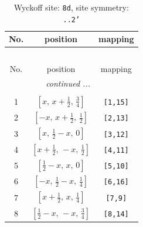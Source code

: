 \documentclass[fleqn,8pt]{jsarticle}
\begin{document}
\begin{longtable}{ccc}
\caption{Wyckoff site: {\tt 8d}, site symmetry: {\tt ..2'}}
 \\
 \hline \hline
No. & position & mapping \\ \hline \endfirsthead

\multicolumn{2}{l}{\tablename\ \thetable{}} \\
 \hline \hline
No. & position & mapping \\ \hline \endhead

 \hline \hline
\multicolumn{2}{r}{\footnotesize\it continued ...} \\ \endfoot

 \hline \hline
\multicolumn{2}{r}{} \\ \endlastfoot

1 & $\left[ x,\, x + \frac{1}{2},\, \frac{3}{4} \right]$ & {\tt [1,15]} \\ \hline
2 & $\left[ - x,\, x + \frac{1}{2},\, \frac{1}{2} \right]$ & {\tt [2,13]} \\ \hline
3 & $\left[ x,\, \frac{1}{2} - x,\, 0 \right]$ & {\tt [3,12]} \\ \hline
4 & $\left[ x + \frac{1}{2},\, - x,\, \frac{1}{2} \right]$ & {\tt [4,11]} \\ \hline
5 & $\left[ \frac{1}{2} - x,\, x,\, 0 \right]$ & {\tt [5,10]} \\ \hline
6 & $\left[ - x,\, \frac{1}{2} - x,\, \frac{1}{4} \right]$ & {\tt [6,16]} \\ \hline
7 & $\left[ x + \frac{1}{2},\, x,\, \frac{1}{4} \right]$ & {\tt [7,9]} \\ \hline
8 & $\left[ \frac{1}{2} - x,\, - x,\, \frac{3}{4} \right]$ & {\tt [8,14]} \\
\end{longtable}
\renewcommand{\arraystretch}{1.2}
\end{document}

